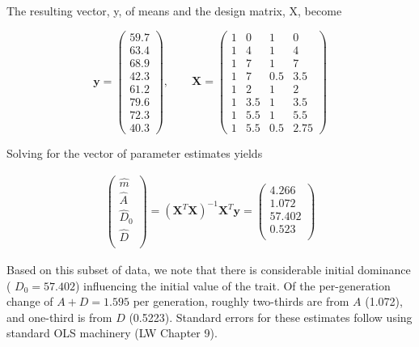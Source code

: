 \documentclass{article}
\begin{document}
The resulting vector, y, of means and the design matrix, X, become

\begin{equation}
\mathbf{y}=\begin{pmatrix}{{{59.7}}} \\{{{63.4}}} \\{{{68.9}}} \\{{{42.3}}} \\{{{61.2}}} \\{{{79.6}}} \\{{{72.3}}} \\{{{40.3}}}\end{pmatrix},\qquad\mathbf{X}=\begin{pmatrix}{{{1}}}&{{{0}}}&{{{1}}}&{{{0}}} \\{{{1}}}&{{{4}}}&{{{1}}}&{{{4}}} \\{{{1}}}&{{{7}}}&{{{1}}}&{{{7}}} \\{{{1}}}&{{{7}}}&{{{0.5}}}&{{{3.5}}} \\{{{1}}}&{{{2}}}&{{{1}}}&{{{2}}} \\{{{1}}}&{{{3.5}}}&{{{1}}}&{{{3.5}}} \\{{{1}}}&{{{5.5}}}&{{{1}}}&{{{5.5}}} \\{{{1}}}&{{{5.5}}}&{{{0.5}}}&{{{2.75}}}\end{pmatrix}
\end{equation}

Solving for the vector of parameter estimates yields

\begin{equation}
\begin{aligned}\left(\begin{array}{c}\widehat{m}\\\widehat{A}\\\widehat{D}_{0}\\\widehat{D}\\\end{array}\right)=\left(\mathbf{X}^{T}\mathbf{X}\right)^{-1}\mathbf{X}^{T}\mathbf{y}=\left(\begin{array}{c}4.266\\1.072\\57.402\\0.523\\\end{array}\right)\end{aligned}
\end{equation}

Based on this subset of data, we note that there is considerable initial dominance ( $ D_0 = 57.402 $) influencing the initial value of the trait. Of the per-generation change of  $ A + D = 1.595 $ per generation, roughly two-thirds are from  $ A $ (1.072), and one-third is from  $ D $ (0.5223). Standard errors for these estimates follow using standard OLS machinery (LW Chapter 9).
\end{document}
